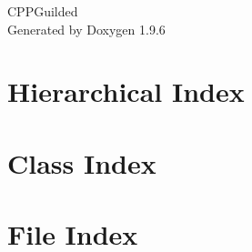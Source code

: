 \documentclass[twoside]{book}
\newcommand{\+}{\discretionary{\mbox{\scriptsize$\hookleftarrow$}}{}{}}
\newcommand{\clearemptydoublepage}{%
    \newpage{\pagestyle{empty}\cleardoublepage}%
  }
\begin{document}
  \raggedbottom
    \hypersetup{pageanchor=false,
                bookmarksnumbered=true,
                pdfencoding=unicode
               }
  \begin{titlepage}
  \vspace*{7cm}
  \begin{center}%
  {\Large CPPGuilded}\\
  \vspace*{1cm}
  {\large Generated by Doxygen 1.9.6}\\
  \end{center}
  \end{titlepage}
  \clearemptydoublepage
  \tableofcontents
  \clearemptydoublepage
  \hypersetup{pageanchor=true}
\chapter{Hierarchical Index}

\chapter{Class Index}

\chapter{File Index}

\end{document}
